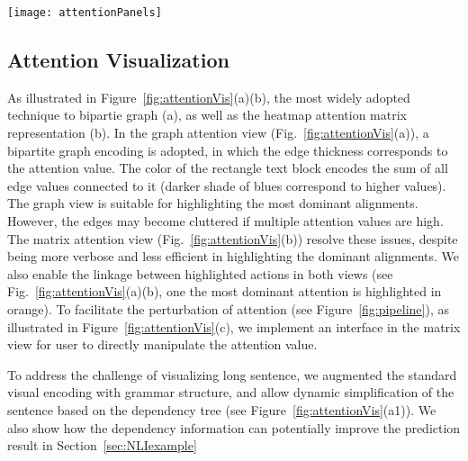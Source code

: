 \begin{figure*}[t]
\centering
\vspace{-2mm}
 \texttt{[image: attentionPanels]}
  \vspace{-3mm}
 \caption{
Attention visualization. In the graph attention view (a), a bipartite graph encoding is adopted, in which the edge thickness corresponds to the attention value. In the matrix attention view (b), the entries of $i^{th}$ row represent the probabilities of words in hypotheses align to the $i^{th}$ word in the premise.
The user can alter the attention values via the pop-up interface illustrated in (c).
We overlay the dependency tree ($a_1$) grammar structure to highlight important words and allow simplification of complex sentence based on the dependency tree.
%
For highly asymmetric attention relationship, we utilized a zoomable hierarchical visual representation (d).
}
\label{fig:attentionVis}
\end{figure*}

\subsection{Attention Visualization}
As illustrated in Figure~\ref{fig:attentionVis}(a)(b), the most widely adopted technique to bipartie graph (a), as well as the heatmap attention matrix representation (b). 
%
In the graph attention view (Fig.~\ref{fig:attentionVis}(a)), a bipartite graph encoding is adopted, in which the edge thickness corresponds to the attention value. The color of the rectangle text block encodes the sum of all edge values connected to it (darker shade of blues correspond to higher values).
The graph view is suitable for highlighting the most dominant alignments. However, the edges may become cluttered if multiple attention values are high. The matrix attention view (Fig.~\ref{fig:attentionVis}(b)) resolve these issues, despite being more verbose and less efficient in highlighting the dominant alignments. 
We also enable the linkage between highlighted actions in both views (see Fig.~\ref{fig:attentionVis}(a)(b), one the most dominant attention is highlighted in orange).
%
To facilitate the perturbation of attention (see Figure~\ref{fig:pipeline}), as illustrated in Figure~\ref{fig:attentionVis}(c), we implement an interface in the matrix view for user to directly manipulate the attention value.

To address the challenge of visualizing long sentence, we augmented the standard visual encoding with grammar structure, and allow dynamic simplification of the sentence based on the dependency tree (see Figure~\ref{fig:attentionVis}(a1)). We also show how the dependency information can potentially improve the prediction result in Section~\ref{sec:NLIexample}

